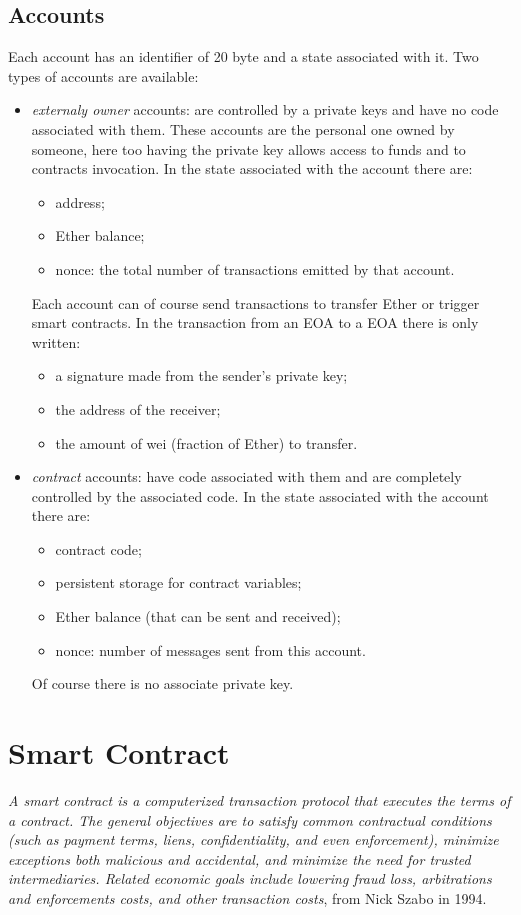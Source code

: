 \subsection{Accounts}
Each account has an identifier of 20 byte and a state associated with it.
Two types of accounts are available:
\begin{itemize}
    \item \emph{externaly owner} accounts: are controlled by a private keys and have no code associated with them.
    These accounts are the personal one owned by someone, here too having the private key allows access to funds and to contracts invocation.
    In the state associated with the account there are:
    \begin{itemize}
        \item address;
        \item Ether balance;
        \item nonce: the total number of transactions emitted by that account.
    \end{itemize}
    Each account can of course send transactions to transfer Ether or trigger smart contracts.
    In the transaction from an EOA to a EOA there is only written:
    \begin{itemize}
        \item a signature made from the sender's private key;
        \item the address of the receiver;
        \item the amount of wei (fraction of Ether) to transfer.
    \end{itemize}
    
    \item \emph{contract} accounts: have code associated with them and are completely controlled by the associated code.
    In the state associated with the account there are:
    \begin{itemize}
        \item contract code;
        \item persistent storage for contract variables;
        \item Ether balance (that can be sent and received);
        \item nonce: number of messages sent from this account.
    \end{itemize}
    Of course there is no associate private key.
\end{itemize}

\section{Smart Contract}
\emph{A smart contract is a computerized transaction protocol that executes the terms of a contract. The general objectives are to satisfy common contractual conditions (such as payment terms, liens, confidentiality, and even enforcement), minimize exceptions both malicious and accidental, and minimize the need for trusted intermediaries. Related economic goals include lowering fraud loss, arbitrations and enforcements costs, and other transaction costs}, from Nick Szabo in 1994.

